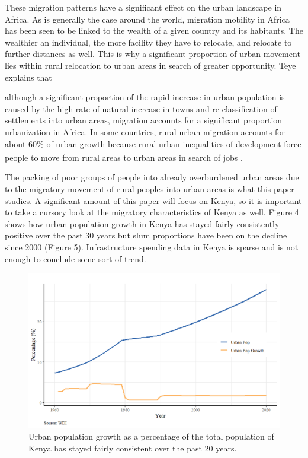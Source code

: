 These migration patterns have a significant effect on the urban landscape in Africa. As is generally the case around the world, migration mobility in Africa has been seen to be linked to the wealth of a given country and its habitants. The wealthier an individual, the more facility they have to relocate, and relocate to further distances as well. This is why a significant proportion of urban movement lies within rural relocation to urban areas in search of greater opportunity. Teye explains that 
\begin{quoting}although a significant proportion of the rapid increase in urban population is caused by the high rate of natural increase in towns and re-classification of settlements into urban areas, migration accounts for a significant proportion urbanization in Africa. In some countries, rural-urban migration accounts for about 60\% of urban growth because rural-urban inequalities of development force people to move from rural areas to urban areas in search of jobs \textsuperscript{\cite{Teye}}.\end{quoting} 

The packing of poor groups of people into already overburdened urban areas due to the migratory movement of rural peoples into urban areas is what this paper studies. A significant amount of this paper will focus on Kenya, so it is important to take a cursory look at the migratory characteristics of Kenya as well. Figure 4 shows how urban population growth in Kenya has stayed fairly consistently positive over the past 30 years but slum proportions have been on the decline since 2000 (Figure 5). Infrastructure spending data in Kenya is sparse and is not enough to conclude some sort of trend.

\begin{figure}
    \centering
    \includegraphics[scale = 0.65]{Graphics/Kenya Urban Population Percentage.png}    
    \caption{Urban population growth as a percentage of the total population of Kenya has stayed fairly consistent over the past 20 years.}
    \label{fig:KenyaUrban}
\end{figure}


